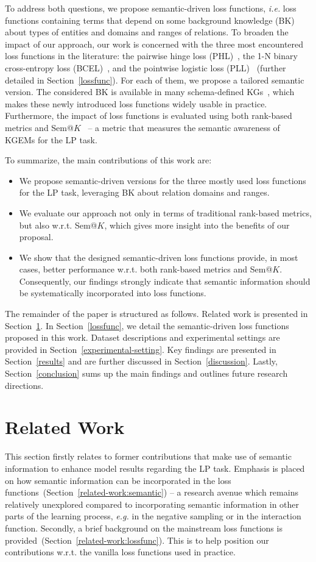 \documentclass[letterpaper]{article} %
\begin{document}
To address both questions, we propose semantic-driven loss functions, \textit{i.e.} loss functions containing terms that depend on some background knowledge (BK) about types of entities and domains and ranges of relations. 
To broaden the impact of our approach, our work is concerned with the three most encountered loss functions in the literature: the pairwise hinge loss (PHL)~\cite{transe}, the 1-N binary cross-entropy loss (BCEL)~\cite{conve}, and the pointwise logistic loss (PLL)~\cite{complex} (further detailed in Section~\ref{lossfunc}).
For each of them, we propose a tailored semantic version.
The considered BK is available in many schema-defined KGs~\cite{ding2018}, which makes these newly introduced loss functions widely usable in practice.
 Furthermore, the impact of loss functions is evaluated using both rank-based metrics and Sem@$K$~\cite{dl4kg,hubert2023} -- a metric that measures the semantic awareness of KGEMs for the LP task.

To summarize, the main contributions of this work are: 
\begin{itemize}
    \item We propose semantic-driven versions for the three mostly used loss functions for the LP task, leveraging BK about relation domains and ranges.
    \item We evaluate our approach not only in terms of traditional rank-based metrics, but also w.r.t. Sem@$K$, which gives more insight into the benefits of our proposal.
    \item We show that the designed semantic-driven loss functions provide, in most cases, better performance w.r.t. both rank-based metrics and Sem@$K$. Consequently, our findings strongly indicate that semantic information should be systematically incorporated into loss functions.
\end{itemize}
The remainder of the paper is structured as follows. 
Related work is presented in Section~\ref{related-work}. 
In Section~\ref{lossfunc}, we detail the semantic-driven loss functions proposed in this work. 
Dataset descriptions and experimental settings are provided in Section~\ref{experimental-setting}. Key findings are presented in Section~\ref{results} and are further discussed in Section~\ref{discussion}.
Lastly, Section~\ref{conclusion} sums up the main findings and outlines future research directions.

\section{Related Work}\label{related-work}
This section firstly relates to former contributions that make use of semantic information to enhance model results regarding the LP task. Emphasis is placed on how semantic information can be incorporated in the loss functions~(Section~\ref{related-work:semantic}) -- a research avenue which remains relatively unexplored compared to incorporating semantic information in other parts of the learning process, \textit{e.g.} in the negative sampling or in the interaction function. Secondly, a brief background on the mainstream loss functions is provided~(Section~\ref{related-work:lossfunc}). This is to help position our contributions w.r.t. the vanilla loss functions used in practice.
\end{document}
